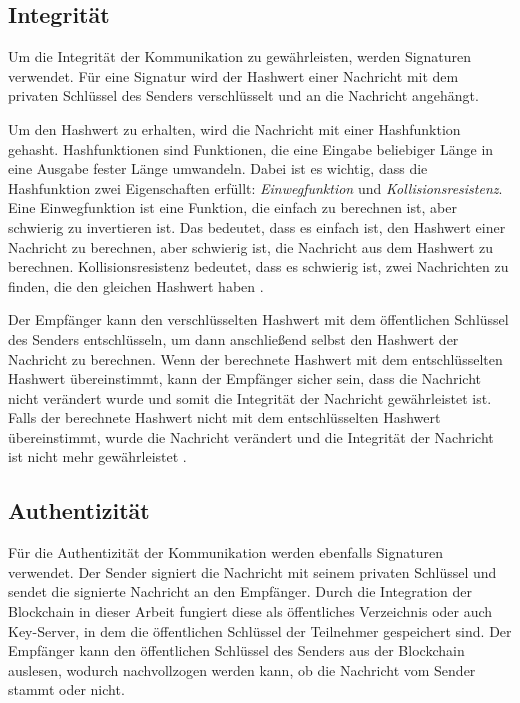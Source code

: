 
\subsection{Integrität}

Um die Integrität der Kommunikation zu gewährleisten, werden Signaturen verwendet. Für eine Signatur wird der Hashwert einer Nachricht mit dem privaten Schlüssel des Senders verschlüsselt und an die Nachricht angehängt. 

Um den Hashwert zu erhalten, wird die Nachricht mit einer Hashfunktion gehasht. Hashfunktionen sind Funktionen, die eine Eingabe beliebiger Länge in eine Ausgabe fester Länge umwandeln. Dabei ist es wichtig, dass die Hashfunktion zwei Eigenschaften erfüllt: \textit{Einwegfunktion} und \textit{Kollisionsresistenz}. Eine Einwegfunktion ist eine Funktion, die einfach zu berechnen ist, aber schwierig zu invertieren ist. Das bedeutet, dass es einfach ist, den Hashwert einer Nachricht zu berechnen, aber schwierig ist, die Nachricht aus dem Hashwert zu berechnen. Kollisionsresistenz bedeutet, dass es schwierig ist, zwei Nachrichten zu finden, die den gleichen Hashwert haben \parencite[S. 13-15]{Brünnler_BlockchainKurzGut}.

Der Empfänger kann den verschlüsselten Hashwert mit dem öffentlichen Schlüssel des Senders entschlüsseln, um dann anschließend selbst den Hashwert der Nachricht zu berechnen. Wenn der berechnete Hashwert mit dem entschlüsselten Hashwert übereinstimmt, kann der Empfänger sicher sein, dass die Nachricht nicht verändert wurde und somit die Integrität der Nachricht gewährleistet ist. Falls der berechnete Hashwert nicht mit dem entschlüsselten Hashwert übereinstimmt, wurde die Nachricht verändert und die Integrität der Nachricht ist nicht mehr gewährleistet \Parencite[S. 73-78]{Hellmann_IT-Sicherheit}.


\subsection{Authentizität}

Für die Authentizität der Kommunikation werden ebenfalls Signaturen verwendet. Der Sender signiert die Nachricht mit seinem privaten Schlüssel und sendet die signierte Nachricht an den Empfänger. Durch die Integration der Blockchain in dieser Arbeit fungiert diese als öffentliches Verzeichnis oder auch Key-Server, in dem die öffentlichen Schlüssel der Teilnehmer gespeichert sind. Der Empfänger kann den öffentlichen Schlüssel des Senders aus der Blockchain auslesen, wodurch nachvollzogen werden kann, ob die Nachricht vom Sender stammt oder nicht.